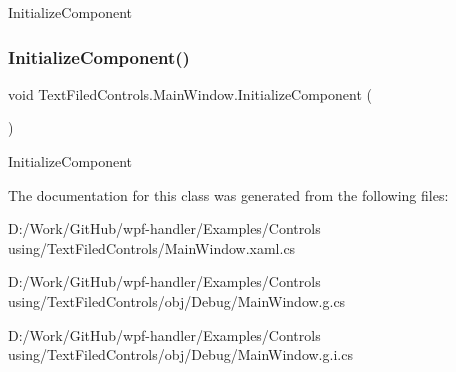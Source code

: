 Initialize\+Component 

\mbox{\label{class_text_filed_controls_1_1_main_window_a77c0faa0e8c0159b20a95cc0f38e6ca7}} 
\subsubsection{\texorpdfstring{Initialize\+Component()}{InitializeComponent()}\hspace{0.1cm}{\footnotesize\ttfamily [4/4]}}
{\footnotesize\ttfamily void Text\+Filed\+Controls.\+Main\+Window.\+Initialize\+Component (\begin{DoxyParamCaption}{ }\end{DoxyParamCaption})}



Initialize\+Component 



The documentation for this class was generated from the following files\+:\begin{DoxyCompactItemize}
\item 
D\+:/\+Work/\+Git\+Hub/wpf-\/handler/\+Examples/\+Controls using/\+Text\+Filed\+Controls/Main\+Window.\+xaml.\+cs\item 
D\+:/\+Work/\+Git\+Hub/wpf-\/handler/\+Examples/\+Controls using/\+Text\+Filed\+Controls/obj/\+Debug/Main\+Window.\+g.\+cs\item 
D\+:/\+Work/\+Git\+Hub/wpf-\/handler/\+Examples/\+Controls using/\+Text\+Filed\+Controls/obj/\+Debug/Main\+Window.\+g.\+i.\+cs\end{DoxyCompactItemize}
